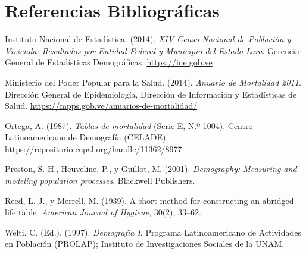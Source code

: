 \documentclass[12pt,letterpaper]{article}
\begin{document}
\section{Referencias Bibliográficas}

\vspace{0.4cm}
\begingroup
{}
\setlength{\parindent}{-1.27cm}
\setlength{\leftskip}{1.27cm}
\setlength{\parskip}{8pt}

Instituto Nacional de Estadística. (2014). \textit{XIV Censo Nacional de Población y Vivienda: Resultados por Entidad Federal y Municipio del Estado Lara}. Gerencia General de Estadísticas Demográficas. \url{https://ine.gob.ve}

Ministerio del Poder Popular para la Salud. (2014). \textit{Anuario de Mortalidad 2011}. Dirección General de Epidemiología, Dirección de Información y Estadísticas de Salud. \url{https://mpps.gob.ve/anuarios-de-mortalidad/}

Ortega, A. (1987). \textit{Tablas de mortalidad} (Serie E, N.º 1004). Centro Latinoamericano de Demografía (CELADE). \url{https://repositorio.cepal.org/handle/11362/8977}

Preston, S. H., Heuveline, P., y Guillot, M. (2001). \textit{Demography: Measuring and modeling population processes}. Blackwell Publishers.

Reed, L. J., y Merrell, M. (1939). A short method for constructing an abridged life table. \textit{American Journal of Hygiene}, 30(2), 33--62.

Welti, C. (Ed.). (1997). \textit{Demografía I}. Programa Latinoamericano de Actividades en Población (PROLAP); Instituto de Investigaciones Sociales de la UNAM.

\endgroup
\end{document}
